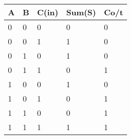 \begin{tabular}{|l|l|l|l|l|}
\hline
A & B & C(in) & Sum(S) & Co/t \\ \hline
0 & 0 & 0     & 0      & 0    \\
0 & 0 & 1     & 1      & 0    \\
0 & 1 & 0     & 1      & 0    \\ 
0 & 1 & 1     & 0      & 1    \\
1 & 0 & 0     & 1      & 0    \\
1 & 0 & 1     & 0      & 1    \\
1 & 1 & 0     & 0      & 1    \\
1 & 1 & 1     & 1      & 1    \\ \hline
\end{tabular}

